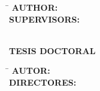 \begin{titlepage}
{      \noindent
      \begin{minipage}[t]{0.40\textwidth}
        \raggedright
        {\itshape\fontsize{14}{20}\selectfont \thetitle\par}
      \end{minipage}%
      \begin{minipage}[t]{0.4\textwidth}
        \raggedright
        \begin{tabbing}
          \hspace{4cm}\=\kill
          \textbf{\fontsize{12}{10}\selectfont AUTHOR:}\> \GetFirstAuthor \\[0.3cm]
          \textbf{\fontsize{12}{10}\selectfont SUPERVISORS:}\> \GetSupervisor   \\
                                              \> \GetCoSupervisor    \\
                                              \> \GetSecCoSupervisor
        \end{tabbing}
      \end{minipage}%
      \begin{minipage}[t]{0.1\textwidth}
        \vspace{1.5cm}
        \raggedleft
        {\fontsize{13}{16}\selectfont \the\year \par}
      \end{minipage}
    }{%
      {\noindent\bfseries\fontsize{12}{14}\selectfont TESIS DOCTORAL\par}
      \vspace{0.5cm}
      {\noindent\raggedright\itshape\fontsize{22}{24}\selectfont \titleesp\par}
      \vspace{2cm}

      \noindent
      
      \begin{minipage}[t]{0.4\textwidth}
        \raggedright
        \begin{tabbing}
          \hspace{4cm}\=\kill
          \textbf{\fontsize{12}{10}\selectfont AUTOR:}\> \GetFirstAuthor \\[0.3cm]
          \textbf{\fontsize{12}{10}\selectfont DIRECTORES:}\> \GetSupervisor   \\
                                              \> \GetCoSupervisor    \\
                                              \> \GetSecCoSupervisor
        \end{tabbing}
      \end{minipage}%
      \begin{minipage}[t]{0.45\textwidth}
        \vspace{2cm}
        \raggedleft
        {\fontsize{13}{16}\selectfont \the\year \par}
      \end{minipage}
    }

    \vspace{1cm}
  \endgroup
\end{titlepage}
\restoregeometry
\MediaOptionLogicBlank